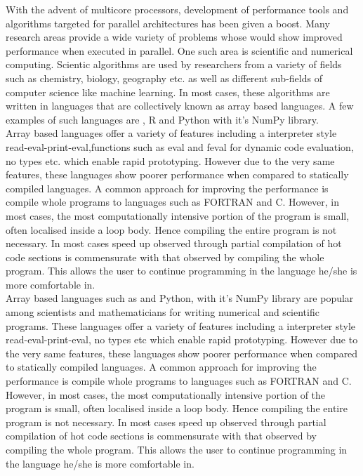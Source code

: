 
With the advent of multicore processors, development of performance tools and algorithms targeted for parallel architectures has been given a boost. Many research areas  provide a wide variety of problems whose would show improved performance when executed in parallel. One such area is scientific and numerical computing. Scientic algorithms are used by researchers from a variety of fields such as chemistry, biology, geography etc. as well as different sub-fields of computer science like machine learning. In most cases, these algorithms are written in languages  that are collectively known as  array based languages. A few examples of such languages are  \matlab, R and Python with it's NumPy library.\\
Array based languages offer a variety of features including a interpreter style read-eval-print-eval,functions such as eval and feval for dynamic code evaluation,  no types etc. which enable rapid prototyping. However due to the very same features, these languages show poorer performance when compared to statically compiled languages. A common approach for improving the performance is compile whole programs to languages such as {\sc FORTRAN} and C. However, in most cases, the most computationally intensive portion of the program is small, often localised inside a loop body. Hence compiling the entire program is not necessary. In most cases speed up observed through partial compilation of hot code sections is commensurate with that observed by compiling the whole program. This allows the user to continue programming in the language he/she is more comfortable in.\\
Array based languages such as \matlab \cite{matlab} and Python, with it's NumPy library are popular among scientists and mathematicians for writing   numerical and scientific programs. These languages offer a variety of features including a interpreter style read-eval-print-eval, no types etc which enable rapid prototyping. However due to the very same features, these languages show poorer performance when compared to statically compiled languages. A common approach for improving the performance is compile whole programs to languages such as {\sc FORTRAN} and C. However, in most cases, the most computationally intensive portion of the program is small, often localised inside a loop body. Hence compiling the entire program is not necessary. In most cases speed up observed through partial compilation of hot code sections is commensurate with that observed by compiling the whole program. This allows the user to continue programming in the language he/she is more comfortable in.\\


